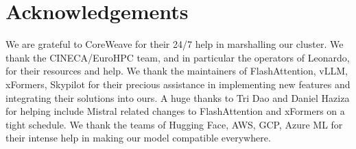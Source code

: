 \documentclass{article}
\begin{document}
\section*{Acknowledgements}
 We are grateful to CoreWeave for their 24/7 help in marshalling our cluster. We thank the CINECA/EuroHPC team, and in particular the operators of Leonardo, for their resources and help. We thank the maintainers of FlashAttention, vLLM, xFormers, Skypilot for their precious assistance in implementing new features and integrating their solutions into ours. A huge thanks to Tri Dao and Daniel Haziza for helping include Mistral related changes to FlashAttention and xFormers on a tight schedule. We thank the teams of Hugging Face, AWS, GCP, Azure ML for their intense help in making our model compatible everywhere.

\vspace{150pt}
\end{document}
